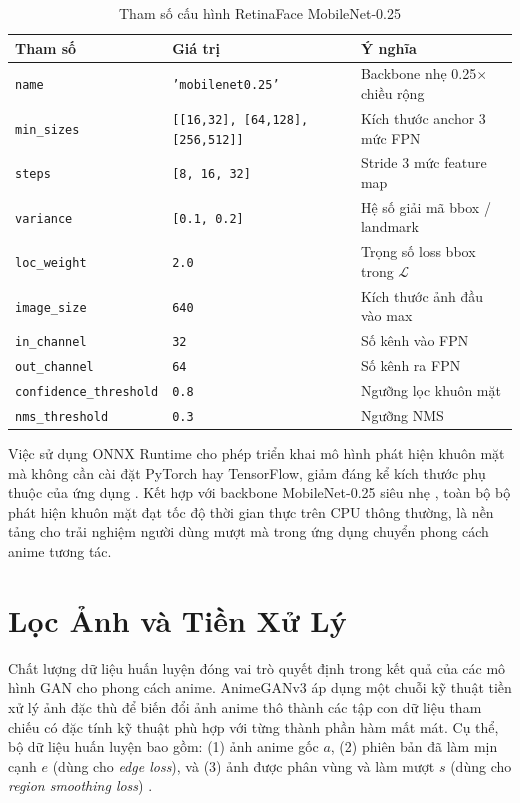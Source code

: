 \begin{table}[H]
\caption{Tham số cấu hình RetinaFace MobileNet-0.25}
\label{tab:retinaface_config}
\centering
\begin{tabular}{|l|p{4cm}|l|}
\hline
\textbf{Tham số} & \textbf{Giá trị} & \textbf{Ý nghĩa} \\
\hline
\texttt{name} & \texttt{'mobilenet0.25'} & Backbone nhẹ 0.25$\times$ chiều rộng \\
\hline
\texttt{min\_sizes} & \texttt{[[16,32], [64,128], [256,512]]} & Kích thước anchor 3 mức FPN \\
\hline
\texttt{steps} & \texttt{[8, 16, 32]} & Stride 3 mức feature map \\
\hline
\texttt{variance} & \texttt{[0.1, 0.2]} & Hệ số giải mã bbox / landmark \\
\hline
\texttt{loc\_weight} & \texttt{2.0} & Trọng số loss bbox trong $\mathcal{L}$ \\
\hline
\texttt{image\_size} & \texttt{640} & Kích thước ảnh đầu vào max \\
\hline
\texttt{in\_channel} & \texttt{32} & Số kênh vào FPN \\
\hline
\texttt{out\_channel} & \texttt{64} & Số kênh ra FPN \\
\hline
\texttt{confidence\_threshold} & \texttt{0.8} & Ngưỡng lọc khuôn mặt \\
\hline
\texttt{nms\_threshold} & \texttt{0.3} & Ngưỡng NMS \\
\hline
\end{tabular}
\end{table}

Việc sử dụng ONNX Runtime cho phép triển khai mô hình phát hiện khuôn mặt
mà không cần cài đặt PyTorch hay TensorFlow, giảm đáng kể kích thước phụ thuộc của ứng dụng
\cite{ONNX2019}. Kết hợp với backbone MobileNet-0.25 siêu nhẹ \cite{Howard2017MobileNet},
toàn bộ bộ phát hiện khuôn mặt đạt tốc độ thời gian thực trên CPU thông thường, là nền tảng
cho trải nghiệm người dùng mượt mà trong ứng dụng chuyển phong cách anime tương tác.


\section{Lọc Ảnh và Tiền Xử Lý}
\label{sec:image_preprocessing}

Chất lượng dữ liệu huấn luyện đóng vai trò quyết định trong kết quả của các mô hình GAN
cho phong cách anime. AnimeGANv3 áp dụng một chuỗi kỹ thuật tiền xử lý ảnh đặc thù để
biến đổi ảnh anime thô thành các tập con dữ liệu tham chiếu có đặc tính kỹ thuật phù hợp
với từng thành phần hàm mất mát. Cụ thể, bộ dữ liệu huấn luyện bao gồm: (1) ảnh anime gốc
$a$, (2) phiên bản đã làm mịn cạnh $e$ (dùng cho \textit{edge loss}), và (3) ảnh được
phân vùng và làm mượt $s$ (dùng cho \textit{region smoothing loss}) \cite{Liu2024}.

